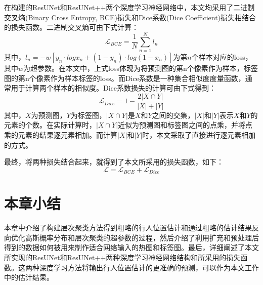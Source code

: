在构建的ResUNet和ResUNet++两个深度学习神经网络中，本文均采用了二进制交叉熵(Binary Cross Entropy, BCE)损失和Dice系数(Dice Coefficient)损失相结合的损失函数。二进制交叉熵可由下式计算：
\begin{equation}
  \mathcal{L}_{BCE} = \frac{1}{N}\sum_{n=1}^{N}l_{n}
\end{equation}
其中，$l_n=-w[y_n \cdot log{x_n}+(1-y_n) \cdot log(1-x_n)]$为第$n$个样本对应的loss，其中$w$为超参数。在本文中，上式loss体现为将预测图的第n个像素作为样本，标签图的第n个像素作为样本标签的loss。而Dice系数是一种集合相似度度量函数，通常用于计算两个样本的相似度。Dice系数损失的计算可由下式得到：
\begin{equation}
  \mathcal{L}_{Dice} = 1-\frac{2|X \cap Y|}{|X|+|Y|}
\end{equation}
其中，$X$为预测图，$Y$为标签图，$|X \cap Y|$是$X$和$Y$之间的交集，$|X|$和$|Y|$表示$X$和$Y$的元素的个数。在实际计算时，$|X \cap Y|$近似为预测图和标签图之间的点乘，并将点乘的元素的结果逐元素相加。而计算$|X|$和$|Y|$时，本文采取了直接进行逐元素相加的方式。

最终，将两种损失结合起来，就得到了本文所采用的损失函数，如下：
\begin{equation}
  \mathcal{L} = \mathcal{L}_{BCE} + \mathcal{L}_{Dice}
\end{equation}

\section{本章小结}

本章中介绍了构建层次聚类方法得到粗略的行人位置估计和通过粗略的估计结果反向优化高斯概率分布和层次聚类的超参数的过程，然后介绍了利用扩充和预处理后得到的数据如何被用来制作适合网络输入的热图和标签图。最后，详细阐述了本文所实现的ResUNet和ResUNet++两种深度学习神经网络结构和所采用的损失函数。这两种深度学习方法将输出行人位置估计的更准确的预测，可以作为本文工作中的估计结果。
